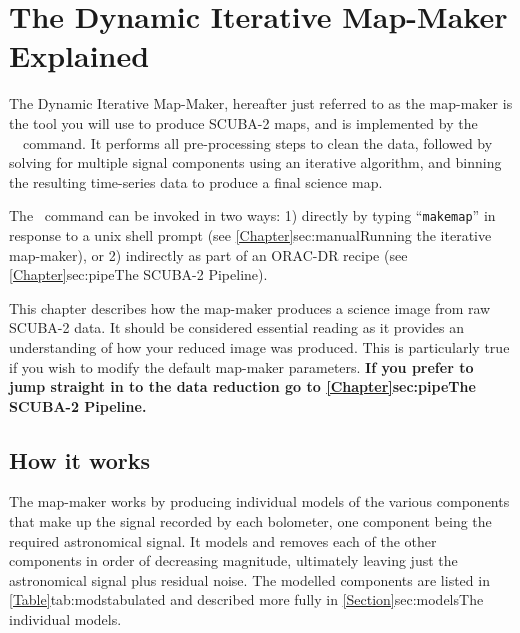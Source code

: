 \chapter{The Dynamic Iterative Map-Maker Explained}
\label{sec:dimm}

The Dynamic Iterative Map-Maker, hereafter just referred to as the
map-maker is the tool you will use to produce SCUBA-2 maps, and is
implemented by the \smurf\ \makemap\ command. It performs
all pre-processing steps to clean the data, followed by solving for
multiple signal components using an iterative algorithm, and binning
the resulting time-series data to produce a final science map.

The \makemap\ command can be invoked in two ways: 1) directly by typing
``\texttt{makemap}'' in response to a unix shell prompt (see
\cref{Chapter}{sec:manual}{Running the iterative map-maker}), or 2)
indirectly as part of an ORAC-DR recipe (see
\cref{Chapter}{sec:pipe}{The SCUBA-2 Pipeline}).

This chapter describes how the map-maker produces a science image
from raw SCUBA-2 data. It should be considered essential reading as it
provides an understanding of how your reduced image was produced. This is
particularly true if you wish to modify the default map-maker parameters.
\color{red}\textbf{ If you prefer to jump straight in to the data reduction go
to \cref{Chapter}{sec:pipe}{The SCUBA-2 Pipeline}.}\color{black}


\section{How it works}

The map-maker works by producing individual models of the various
components that make up the signal recorded by each bolometer, one
component being the required astronomical signal.  It models and removes
each of the other components in order of decreasing magnitude, ultimately
leaving just the astronomical signal plus residual noise.  The modelled
components are listed in \cref{Table}{tab:mods}{tabulated} and described
more fully in \cref{Section}{sec:models}{The individual models}.

